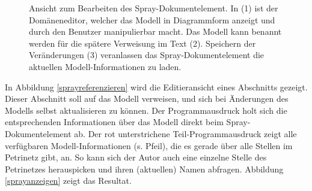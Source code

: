  
\begin{figure}[h!]
\centering
\advance\leftskip-2.5cm
\caption{ Ansicht zum Bearbeiten des Spray-Dokumentelement. In (1) ist der Domäneneditor, welcher das Modell in Diagrammform anzeigt und durch den Benutzer manipulierbar macht. Das Modell kann benannt werden für die spätere Verweisung im Text (2). Speichern der Veränderungen (3) veranlassen das Spray-Dokumentelement die aktuellen Modell-Informationen zu laden. }\label{sprayeditieren}
\end{figure}
 
In Abbildung \ref{sprayreferenzieren} wird die Editieransicht eines Abschnitts gezeigt. Dieser Abschnitt soll auf das Modell verweisen, und sich bei Änderungen des Modells selbst aktualisieren zu können. Der Programmausdruck holt sich die entsprechenden Informationen über das Modell direkt beim Spray-Dokumentelement ab. Der rot unterstrichene Teil-Programmausdruck zeigt alle verfügbaren Modell-Informationen (s. Pfeil),  die es gerade über alle Stellen im Petrinetz gibt, an. So kann sich der Autor auch eine einzelne Stelle des Petrinetzes herauspicken und ihren (aktuellen) Namen abfragen. Abbildung \ref{sprayanzeigen} zeigt das Resultat.

